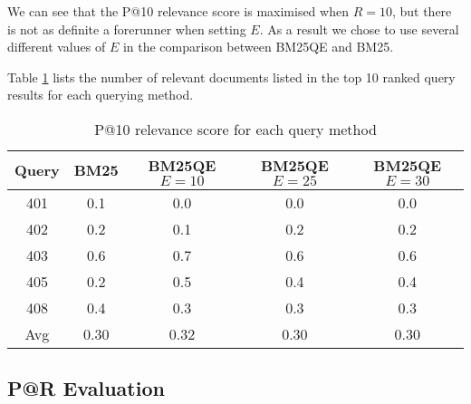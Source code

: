 We can see that the P@10 relevance score is maximised when $R=10$, but there is not as definite a forerunner when setting $E$. As a result we chose to use several different values of $E$ in the comparison between BM25QE and BM25.

Table \ref{table:Pat10result} lists the number of relevant documents listed in the top 10 ranked query results for each querying method.

\begin{table}
\begin{center}
\begin{tabular}{ c | c c c c }
	Query & BM25 & BM25QE $E=10$&BM25QE $E=25$&BM25QE $E=30$\\
	\hline
	401 & 0.1  & 0.0  & 0.0  & 0.0 \\
	402 & 0.2  & 0.1  & 0.2  & 0.2 \\
	403 & 0.6  & 0.7  & 0.6  & 0.6 \\
	405 & 0.2  & 0.5  & 0.4  & 0.4 \\
	408 & 0.4  & 0.3  & 0.3  & 0.3 \\
	\hline
	Avg & 0.30 & 0.32 & 0.30 & 0.30 \\
\end{tabular}
\end{center}
\caption {P@10 relevance score for each query method}\label{table:Pat10result}
\end{table}


\newpage
\subsection*{P@R Evaluation}
